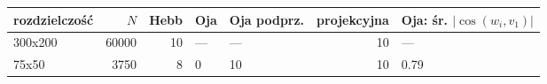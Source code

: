 \begin{tabular}{lrrllrl}

\toprule

rozdzielczość & $N$ & Hebb & Oja & Oja podprz. & projekcyjna & Oja: śr. $|\cos(w_i,v_1)|$ \\

\midrule

300x200 & 60000 & 10 & --- & --- & 10 & --- \\

75x50 & 3750 & 8 & 0 & 10 & 10 & 0.79 \\

\bottomrule

\end{tabular}


